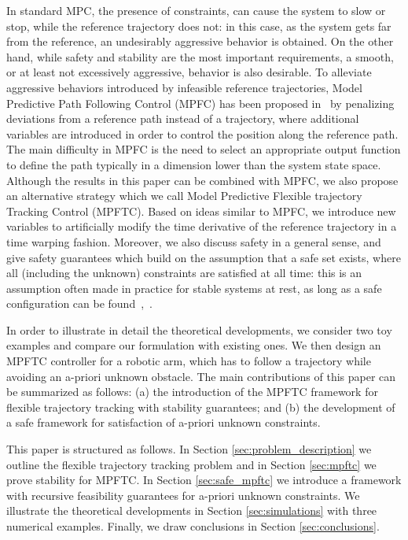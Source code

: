 \documentclass[journal]{IEEEtran}
\begin{document}
	In standard MPC, the presence of constraints, can cause the system to slow or stop, while the reference trajectory does not: in this case, as the system gets far from the reference, an undesirably aggressive behavior is obtained. On the other hand, while safety and stability are the most important requirements, a smooth, or at least not excessively aggressive, behavior is also desirable. To alleviate aggressive behaviors introduced by infeasible reference trajectories, Model Predictive Path Following Control (MPFC) has been proposed in~\cite{aguiar2005path,Faulwasser2009,kanjanawanishkul2009path,alessandretti2013trajectory,Faulwasser2016,faulwasser_implementation} by penalizing deviations from a reference path instead of a trajectory, where additional variables are introduced in order to control the position along the reference path.  The main difficulty in MPFC is the need to select an appropriate output function to define the path typically in a dimension lower than the system state space. 
	Although the results in this paper can be combined with MPFC, we also propose an alternative strategy which we call Model Predictive Flexible trajectory Tracking Control (MPFTC). Based on ideas similar to MPFC, we introduce new variables to artificially modify the time derivative of the reference trajectory in a time warping fashion. Moreover, we also discuss safety in a general sense, and give safety guarantees which build on the assumption that a safe set exists, where all (including the unknown) constraints are satisfied at all time: this is an assumption often made in practice  for stable systems at rest, as long as a safe configuration can be found~\cite{petti2005safe},~\cite{liu2017provably,beckert2017online}. 
	
	
	 In order to illustrate in detail the theoretical developments, we consider two toy examples and compare our formulation with existing ones. We then design an MPFTC controller for a robotic arm, which has to follow a trajectory while avoiding an a-priori unknown obstacle. The main contributions of this paper can be summarized as follows: (a) the introduction of the MPFTC framework for flexible trajectory tracking with stability guarantees; and (b) the development of a safe framework for satisfaction of a-priori unknown constraints. 
	
	This paper is structured as follows. In Section \ref{sec:problem_description} we outline the flexible trajectory tracking problem and in Section \ref{sec:mpftc}  we prove stability for MPFTC. In Section \ref{sec:safe_mpftc} we introduce a framework with recursive feasibility guarantees for a-priori unknown constraints. We illustrate the theoretical developments in Section \ref{sec:simulations} with three numerical examples. Finally, we draw conclusions in Section \ref{sec:conclusions}.
	
\end{document}
